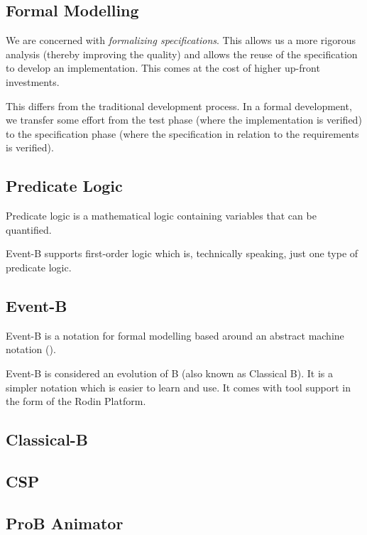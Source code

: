 \documentclass[twoside,10pt]{book}
\begin{document}
\subsection{Formal Modelling}

We are concerned with \textit{formalizing specifications}.  This allows us a more rigorous analysis (thereby improving the quality) and allows the reuse of the specification to develop an implementation.  This comes at the cost of higher up-front investments.

This differs from the traditional development process. In a formal development, we transfer some effort from the test phase (where the implementation is verified) to the specification phase (where the specification in relation to the requirements is verified).

\subsection{Predicate Logic}
\label{predicate_logic}

Predicate logic is a mathematical logic containing variables that can be quantified.

Event-B supports first-order logic which is, technically speaking, just one type of predicate logic.  

\subsection{Event-B}
\label{eventb}

Event-B is a notation for formal modelling based around an abstract machine notation ().

Event-B is considered an evolution of B (also known as Classical B). It is a simpler notation which is easier to learn and use. It comes with tool support in the form of the Rodin Platform.

\subsection{Classical-B}
\label{classicalb}

\subsection{CSP}
\label{csp}

\subsection{ProB Animator}
\label{prob_animator}
\end{document}
